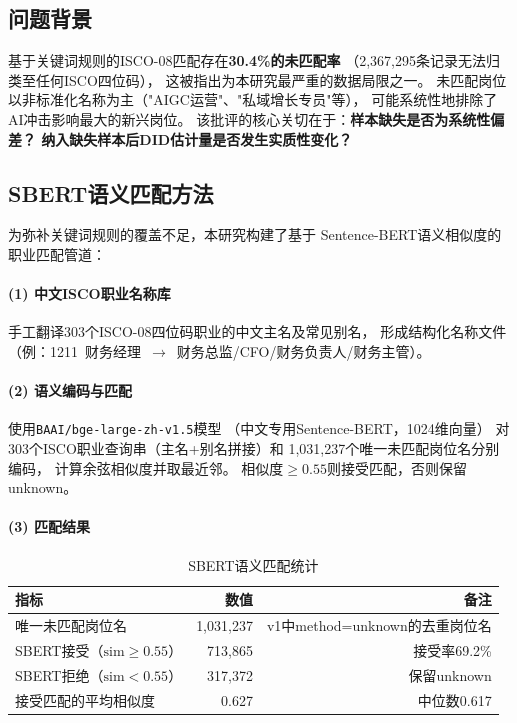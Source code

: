 \documentclass[12pt,a4paper]{ctexart}
\begin{document}
\subsection{问题背景}

基于关键词规则的ISCO-08匹配存在\textbf{30.4\%的未匹配率}
（2,367,295条记录无法归类至任何ISCO四位码），
这被指出为本研究最严重的数据局限之一。
未匹配岗位以非标准化名称为主（"AIGC运营"、"私域增长专员"等），
可能系统性地排除了AI冲击影响最大的新兴岗位。
该批评的核心关切在于：\textbf{样本缺失是否为系统性偏差？
纳入缺失样本后DID估计量是否发生实质性变化？}

\subsection{SBERT语义匹配方法}

为弥补关键词规则的覆盖不足，本研究构建了基于
Sentence-BERT语义相似度的职业匹配管道：

\paragraph{(1) 中文ISCO职业名称库}
手工翻译303个ISCO-08四位码职业的中文主名及常见别名，
形成结构化名称文件
（例：1211~财务经理~$\to$~财务总监/CFO/财务负责人/财务主管）。

\paragraph{(2) 语义编码与匹配}
使用\texttt{BAAI/bge-large-zh-v1.5}模型
（中文专用Sentence-BERT，1024维向量）
对303个ISCO职业查询串（主名+别名拼接）和
1,031,237个唯一未匹配岗位名分别编码，
计算余弦相似度并取最近邻。
相似度$\geq 0.55$则接受匹配，否则保留unknown。

\paragraph{(3) 匹配结果}

\begin{table}[h!]
\centering
\caption{SBERT语义匹配统计}
\label{tab:sbert_match}
\begin{tabular}{lrr}
\toprule
指标 & 数值 & 备注 \\
\midrule
唯一未匹配岗位名 & 1,031,237 & v1中method=unknown的去重岗位名 \\
SBERT接受（$\text{sim}\geq 0.55$） & 713,865 & 接受率69.2\% \\
SBERT拒绝（$\text{sim}<0.55$） & 317,372 & 保留unknown \\
\midrule
接受匹配的平均相似度 & 0.627 & 中位数0.617 \\
\bottomrule
\end{tabular}
\end{table}
\end{document}

